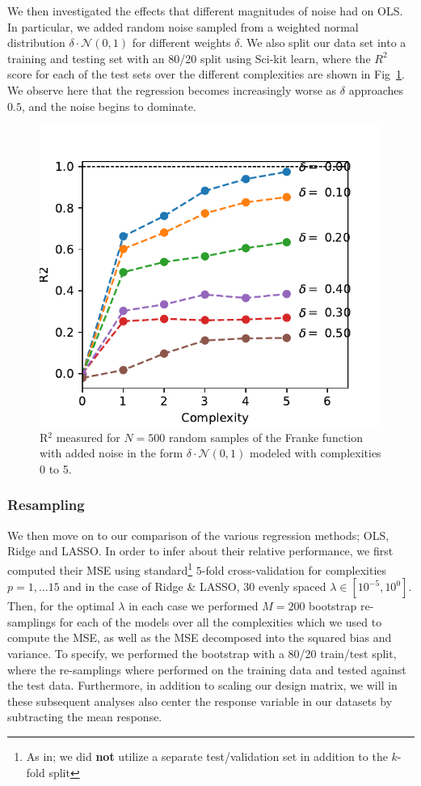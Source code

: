 \documentclass[reprint, english, nofootinbib]{revtex4-2}
\begin{document}
We then investigated the effects that different magnitudes of noise had on OLS. In particular, we added random noise sampled from a weighted normal distribution $\delta \cdot \mathcal N(0, 1)$ for different weights $\delta$. We also split our data set into a training and testing set with an 80/20 split using Sci-kit learn, where the $R^2$ score for each of the test sets over the different complexities are shown in Fig~\ref{fig:r2_vs_noise}.
We observe here that the regression becomes increasingly worse as $\delta$ approaches $0.5$, and the noise begins to dominate.

\begin{figure}[h!tb]
    \center
    \includegraphics[width=.8\columnwidth]{OLS_R2_noise.pdf}
    \caption{R$^2$ measured for $N=500$ random samples of the Franke function with added noise in the form $\delta\cdot\mathcal N(0, 1)$ modeled with complexities 0 to 5.}
    \label{fig:r2_vs_noise}
\end{figure}


\subsubsection{Resampling}
\noindent
We then move on to our comparison of the various regression methods; OLS, Ridge and LASSO. In order to infer about their relative performance, we first computed their MSE using standard\footnote{As in; we did \textbf{not} utilize a separate test/validation set in addition to the $k$-fold split} $5$-fold cross-validation for complexities $p=1, \dots 15$ and in the case of Ridge \& LASSO, 30 evenly spaced $\lambda \in [10^{-5}, 10^{0}]$. Then, for the optimal $\lambda$ in each case we performed $M=200$ bootstrap re-samplings for each of the models over all the complexities which we used to compute the MSE, as well as the MSE decomposed into the squared bias and variance. To specify, we performed the bootstrap with a 80/20 train/test split, where the re-samplings where performed on the training data and tested against the test data.
Furthermore, in addition to scaling our design matrix, we will in these subsequent analyses also center the response variable in our datasets by subtracting the mean response.
\end{document}
